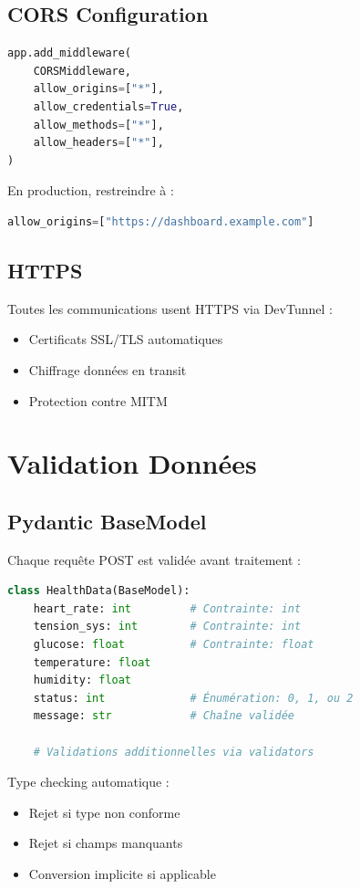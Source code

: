 \documentclass[12pt,french]{report}
\begin{document}
\subsection{CORS Configuration}

\begin{lstlisting}[language=Python]
app.add_middleware(
    CORSMiddleware,
    allow_origins=["*"],
    allow_credentials=True,
    allow_methods=["*"],
    allow_headers=["*"],
)
\end{lstlisting}

En production, restreindre à :
\begin{lstlisting}[language=Python]
allow_origins=["https://dashboard.example.com"]
\end{lstlisting}

\subsection{HTTPS}

Toutes les communications usent HTTPS via DevTunnel :
\begin{itemize}
    \item Certificats SSL/TLS automatiques
    \item Chiffrage données en transit
    \item Protection contre MITM
\end{itemize}

\section{Validation Données}

\subsection{Pydantic BaseModel}

Chaque requête POST est validée avant traitement :

\begin{lstlisting}[language=Python]
class HealthData(BaseModel):
    heart_rate: int         # Contrainte: int
    tension_sys: int        # Contrainte: int
    glucose: float          # Contrainte: float
    temperature: float
    humidity: float
    status: int             # Énumération: 0, 1, ou 2
    message: str            # Chaîne validée
    
    # Validations additionnelles via validators
\end{lstlisting}

Type checking automatique :
\begin{itemize}
    \item Rejet si type non conforme
    \item Rejet si champs manquants
    \item Conversion implicite si applicable
\end{itemize}
\end{document}
